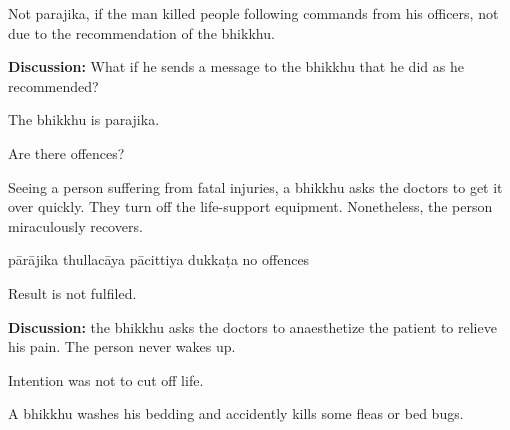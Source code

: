 \begin{exam}{\autoExamName}
\begin{problem*}
\begin{parts}
    \bigskip

    \begin{solution}
      Not parajika, if the man killed people following commands from his officers, not due to the recommendation of the bhikkhu.
    \end{solution}

    \textbf{Discussion:} What if he sends a message to the bhikkhu that he did
    as he recommended?

    \begin{solution}
      The bhikkhu is parajika.
    \end{solution}

  \end{parts}

\end{problem*}

\begin{problem*}

  Are there offences?

\begin{parts}

  \item Seeing a person suffering from fatal injuries, a bhikkhu asks the doctors to
  get it over quickly. They turn off the life-support equipment. Nonetheless, the person
  miraculously recovers.

  \bigskip

  \begin{answers}{5}
    \bChoices
     pārājika\eAns
     thullacāya\eAns
     pācittiya\eAns
     dukkaṭa\eAns
     no offences\eAns
    \eChoices
  \end{answers}

  \begin{solution}
    Result is not fulfiled.
  \end{solution}

  \bigskip

  \textbf{Discussion:} the bhikkhu asks the doctors to anaesthetize the patient to relieve his pain. The person never wakes up.

  \begin{solution}
    Intention was not to cut off life.
  \end{solution}

  \bigskip

  \item A bhikkhu washes his bedding and accidently kills some fleas or bed bugs.

  \bigskip


\end{parts}
\end{problem*}
\end{exam}

